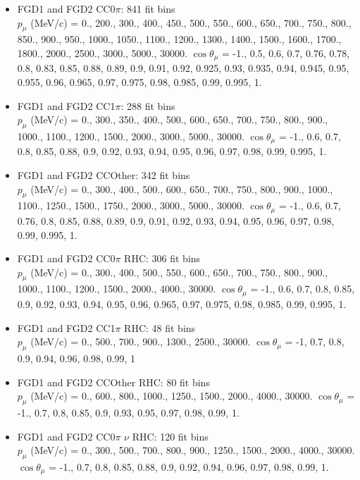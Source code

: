 \begin{itemize}
  \item FGD1 and FGD2 CC0$\pi$: 841 fit bins\\
    $p_\mu$ (MeV/c) = 0., 200., 300., 400., 450., 500., 550., 600., 650., 700., 750., 800., 850., 900., 950., 1000., 1050., 1100., 1200., 1300., 1400., 1500., 1600., 1700., 1800., 2000., 2500., 3000., 5000., 30000.
    $\cos\theta_\mu$ = -1., 0.5, 0.6, 0.7, 0.76, 0.78, 0.8, 0.83, 0.85, 0.88, 0.89, 0.9, 0.91, 0.92, 0.925, 0.93, 0.935, 0.94, 0.945, 0.95, 0.955, 0.96, 0.965, 0.97, 0.975, 0.98, 0.985, 0.99, 0.995, 1.

  \item FGD1 and FGD2 CC1$\pi$: 288 fit bins\\
    $p_\mu$ (MeV/c) = 0., 300., 350., 400., 500., 600., 650., 700., 750., 800., 900., 1000., 1100., 1200., 1500., 2000., 3000., 5000., 30000.
    $\cos\theta_\mu$ = -1., 0.6, 0.7, 0.8, 0.85, 0.88, 0.9, 0.92, 0.93, 0.94, 0.95, 0.96, 0.97, 0.98, 0.99, 0.995, 1.

  \item FGD1 and FGD2 CCOther: 342 fit bins\\
    $p_\mu$ (MeV/c) = 0., 300., 400., 500., 600., 650., 700., 750., 800., 900., 1000., 1100., 1250., 1500., 1750., 2000., 3000., 5000., 30000.
    $\cos\theta_\mu$ = -1., 0.6, 0.7, 0.76, 0.8, 0.85, 0.88, 0.89, 0.9, 0.91, 0.92, 0.93, 0.94, 0.95, 0.96, 0.97, 0.98, 0.99, 0.995, 1.

  \item FGD1 and FGD2 CC0$\pi$ RHC: 306 fit bins\\
    $p_\mu$ (MeV/c) = 0., 300., 400., 500., 550., 600., 650., 700., 750., 800., 900., 1000., 1100., 1200., 1500., 2000., 4000., 30000.
    $\cos\theta_\mu$ = -1., 0.6, 0.7, 0.8, 0.85, 0.9, 0.92, 0.93, 0.94, 0.95, 0.96, 0.965, 0.97, 0.975, 0.98, 0.985, 0.99, 0.995, 1.

  \item FGD1 and FGD2 CC1$\pi$ RHC: 48 fit bins \\
    $p_\mu$ (MeV/c) = 0., 500., 700., 900., 1300., 2500., 30000.
    $\cos\theta_\mu$ = -1, 0.7, 0.8, 0.9, 0.94, 0.96, 0.98, 0.99, 1

  \item FGD1 and FGD2 CCOther RHC: 80 fit bins \\
    $p_\mu$ (MeV/c) = 0., 600., 800., 1000., 1250., 1500., 2000., 4000., 30000.
    $\cos\theta_\mu$ = -1., 0.7, 0.8, 0.85, 0.9, 0.93, 0.95, 0.97, 0.98, 0.99, 1.

  \item FGD1 and FGD2 CC0$\pi$ $\nu$ RHC: 120 fit bins \\
    $p_\mu$ (MeV/c) = 0., 300., 500., 700., 800., 900., 1250., 1500., 2000., 4000., 30000.
     $\cos\theta_\mu$ = -1., 0.7, 0.8, 0.85, 0.88, 0.9, 0.92, 0.94, 0.96, 0.97, 0.98, 0.99, 1.


\end{itemize}
